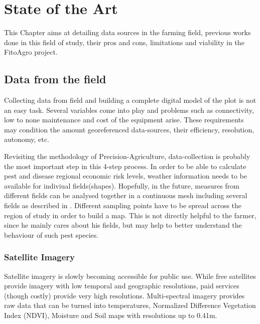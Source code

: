 \chapter{State of the Art}
\label{cha:state_of_the_art}

This Chapter aims at detailing data sources in the farming field, previous works done in this field of study, their pros and cons, limitations and viability in the FitoAgro project.

\section{Data from the field} %
\label{sec:state_of_the_art_data}


Collecting data from field and building a complete digital model of the plot is not an easy task. Several variables come into play and problems such as connectivity, low to none maintenance and cost of the equipment arise. These requirements may condition the amount georeferenced data-sources, their efficiency, resolution, autonomy, etc.

Revisiting the methodology of Precision-Agriculture, data-collection is probably the most important step in this 4-step process. In order to be able to calculate pest and disease regional economic risk levels, weather information needs to be available for indiviual fields(shapes). Hopefully, in the future, measures from different fields can be analysed together in a continuous mesh including several fields as described in \cite{Ojha2015}. Different sampling points have to be spread across the region of study in order to build a map. This is not directly helpful to the farmer, since he mainly cares about his fields, but may help to better understand the behaviour of such pest species.

\subsection{Satellite Imagery}
\label{sec:satellite_imagery}

Satellite imagery is slowly becoming accessible for public use. While free satellites provide imagery with low temporal and geographic resolutions, paid services (though costly) provide very high resolutions. Multi-spectral imagery provides raw data that can be turned into temperatures, Normalized Difference Vegetation Index (NDVI), Moisture and Soil maps with resolutions up to 0.41m.

